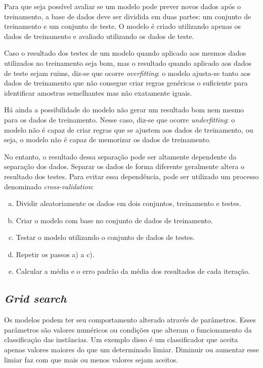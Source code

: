 Para que seja possível avaliar se um modelo pode prever novos dados após o treinamento, a base de dados deve ser dividida em duas partes: um conjunto de treinamento e um conjunto de teste. O modelo é criado utilizando apenas os dados de treinamento e avaliado utilizando os dados de teste.

Caso o resultado dos testes de um modelo quando aplicado aos mesmos dados utilizados no treinamento seja bom, mas o resultado quando aplicado aos dados de teste sejam ruims, diz-se que ocorre \emph{overfitting}: o modelo ajusta-se tanto aos dados de treinamento que não consegue criar regras genéricas o suficiente para identificar amostras semelhantes mas não exatamente iguais.

Há ainda a possibilidade do modelo não gerar um resultado bom nem mesmo para os dados de treinamento. Nesse caso, diz-se que ocorre \emph{underfitting}: o modelo não é capaz de criar regras que se ajustem aos dados de treinamento, ou seja, o modelo não é capaz de memorizar os dados de treinamento.

No entanto, o resultado dessa separação pode ser altamente dependente da separação dos dados. Separar os dados de forma diferente geralmente altera o resultado dos testes. Para evitar essa dependência, pode ser utilizado um processo denominado \emph{cross-validation}:

\begin{enumerate}[a)]
    \item Dividir aleatoriamente os dados em dois conjuntos, treinamento e testes.
    \item Criar o modelo com base no conjunto de dados de treinamento.
    \item Testar o modelo utilizando o conjunto de dados de testes.
    \item Repetir os passos a) a c).
    \item Calcular a média e o erro padrão da média dos resultados de cada iteração.
\end{enumerate}

\subsection{\emph{Grid search}}

Os modelos podem ter seu comportamento alterado através de parâmetros. Esses parâmetros são valores numéricos ou condições que alteram o funcionamento da classificação das instâncias. Um exemplo disso é um classificador que aceita apenas valores maiores do que um determinado limiar. Diminuir ou aumentar esse limiar faz com que mais ou menos valores sejam aceitos.

